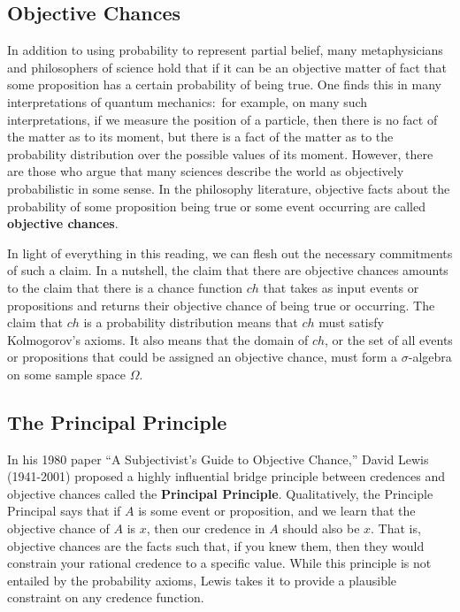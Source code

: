 \documentclass[11pt]{article}
\theoremstyle{definition}
\theoremstyle{remark}
\begin{document}
\subsection{Objective Chances}
In addition to using probability to represent partial belief, many metaphysicians and philosophers of science hold that if it can be an objective matter of fact that some proposition has a certain probability of being true. One finds this in many interpretations of quantum mechanics:\ for example, on many such interpretations, if we measure the position of a particle, then there is no fact of the matter as to its moment, but there is a fact of the matter as to the probability distribution over the possible values of its moment. However, there are those who argue that many sciences describe the world as objectively probabilistic in some sense. In the philosophy literature, objective facts about the probability of some proposition being true or some event occurring are called \textbf{objective chances}.

In light of everything in this reading, we can flesh out the necessary commitments of such a claim. In a nutshell, the claim that there are objective chances amounts to the claim that there is a chance function $ch$ that takes as input events or propositions and returns their objective chance of being true or occurring. The claim that $ch$ is a probability distribution means that $ch$ must satisfy Kolmogorov's axioms. It also means that the domain of $ch$, or the set of all events or propositions that could be assigned an objective chance, must form a $\sigma$-algebra on some sample space $\Omega$.


\subsection{The Principal Principle}
In his 1980 paper ``A Subjectivist's Guide to Objective Chance,'' David Lewis (1941-2001) proposed a highly influential bridge principle between credences and objective chances called the \textbf{Principal Principle}. Qualitatively, the Principle Principal says that if $A$ is some event or proposition, and we learn that the objective chance of $A$ is $x$, then our credence in $A$ should also be $x$. That is, objective chances are the facts such that, if you knew them, then they would constrain your rational credence to a specific value. While this principle is not entailed by the probability axioms, Lewis takes it to provide a plausible constraint on any credence function.\par
\end{document}
